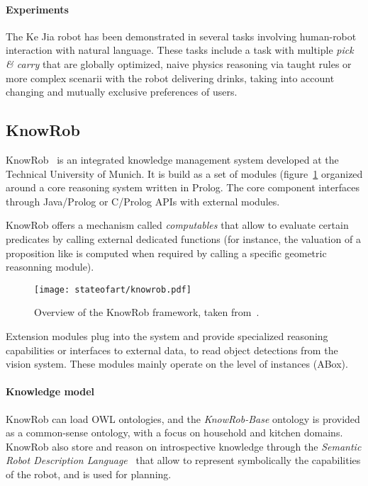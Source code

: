 \paragraph{Experiments} The Ke Jia robot has been demonstrated in several tasks
involving human-robot interaction with natural language. These tasks include a
task with multiple \emph{pick \& carry} that are globally optimized, naive
physics reasoning via taught rules or more complex scenarii with the robot
delivering drinks, taking into account changing and mutually exclusive
preferences of users.


\subsection{KnowRob}
\label{sect|knowrob}


{\sc KnowRob}~\cite{Tenorth2009a} is an integrated knowledge management system
developed at the Technical University of Munich. It is build as a set of
modules (figure~\ref{fig|knowrob} organized around a core reasoning system
written in Prolog. The core component interfaces through Java/Prolog or
C/Prolog APIs with external modules.

{\sc KnowRob} offers a mechanism called \emph{computables} that allow to
evaluate certain predicates by calling external dedicated functions (for
instance, the valuation of a proposition like  is
computed when required by calling a specific geometric reasonning module).

\begin{figure}
    \centering
    \texttt{[image: stateofart/knowrob.pdf]}

    \caption{Overview of the {\sc KnowRob} framework, taken
    from~\cite{Tenorth2011}.}

    \label{fig|knowrob}
\end{figure}


Extension modules plug into the system and provide specialized reasoning
capabilities or interfaces to external data, \eg to read object detections from
the vision system. These modules mainly operate on the level of instances
(ABox).

\paragraph{Knowledge model} {\sc KnowRob} can load OWL ontologies, and the
\emph{KnowRob-Base} ontology is provided as a common-sense ontology, with a
focus on household and kitchen domains. {\sc KnowRob} also store and reason on
introspective knowledge through the \emph{Semantic Robot Description
Language}~\cite{Kunze2011} that allow to represent symbolically the
capabilities of the robot, and is used for planning.


